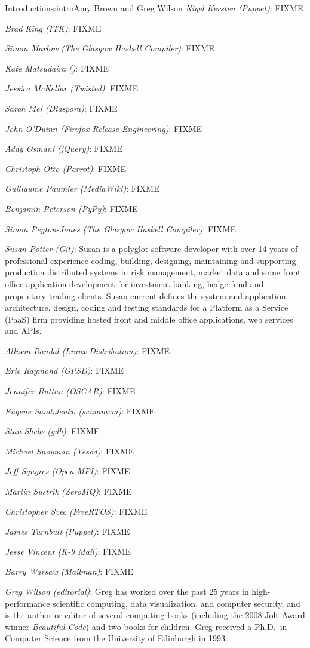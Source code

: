 \begin{aosachapter}{Introduction}{s:intro}{Amy Brown and Greg Wilson}
\emph{Nigel Kersten (Puppet)}: FIXME

\emph{Brad King (ITK)}: FIXME

\emph{Simon Marlow (The Glasgow Haskell Compiler)}: FIXME

\emph{Kate Matsudaira ()}: FIXME

\emph{Jessica McKellar (Twisted)}: FIXME

\emph{Sarah Mei (Diaspora)}: FIXME

\emph{John O'Duinn (Firefox Release Engineering)}: FIXME

\emph{Addy Osmani (jQuery)}: FIXME

\emph{Christoph Otto (Parrot)}: FIXME

\emph{Guillaume Paumier (MediaWiki)}: FIXME

\emph{Benjamin Peterson (PyPy)}: FIXME

\emph{Simon Peyton-Jones (The Glasgow Haskell Compiler)}: FIXME

\emph{Susan Potter (Git)}: Susan is a polyglot software developer with
over 14 years of professional experience coding, building, designing,
maintaining and supporting production distributed systems in risk management,
market data and some front office application development for investment
banking, hedge fund and proprietary trading clients. Susan current defines the
system and application architecture, design, coding and testing standards for
a Platform as a Service (PaaS) firm providing hosted front and middle office
applications, web services and APIs.

\emph{Allison Randal (Linux Distribution)}: FIXME

\emph{Eric Raymond (GPSD)}: FIXME

\emph{Jennifer Ruttan (OSCAR)}: FIXME

\emph{Eugene Sandulenko (scummvm)}: FIXME

\emph{Stan Shebs (gdb)}: FIXME

\emph{Michael Snoyman (Yesod)}: FIXME

\emph{Jeff Squyres (Open MPI)}: FIXME

\emph{Martin Sustrik (ZeroMQ)}: FIXME

\emph{Christopher Svec (FreeRTOS)}: FIXME

\emph{James Turnbull (Puppet)}: FIXME

\emph{Jesse Vincent (K-9 Mail)}: FIXME

\emph{Barry Warsaw (Mailman)}: FIXME

\emph{Greg Wilson (editorial)}: Greg has worked over the past 25 years
in high-performance scientific computing, data visualization, and
computer security, and is the author or editor of several computing
books (including the 2008 Jolt Award winner \emph{Beautiful Code}) and
two books for children.  Greg received a Ph.D.\ in Computer Science
from the University of Edinburgh in 1993.


\end{aosachapter}

